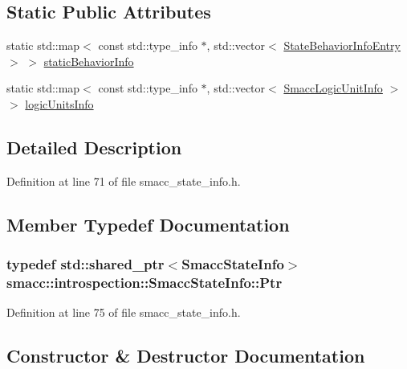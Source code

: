\subsection*{Static Public Attributes}
\begin{DoxyCompactItemize}
\item 
static std\+::map$<$ const std\+::type\+\_\+info $\ast$, std\+::vector$<$ \hyperlink{structsmacc_1_1introspection_1_1StateBehaviorInfoEntry}{State\+Behavior\+Info\+Entry} $>$ $>$ \hyperlink{classsmacc_1_1introspection_1_1SmaccStateInfo_a2cc62c6c9dec1a4f5294f8430efb71f2}{static\+Behavior\+Info}
\item 
static std\+::map$<$ const std\+::type\+\_\+info $\ast$, std\+::vector$<$ \hyperlink{structsmacc_1_1introspection_1_1SmaccLogicUnitInfo}{Smacc\+Logic\+Unit\+Info} $>$ $>$ \hyperlink{classsmacc_1_1introspection_1_1SmaccStateInfo_a7a22f3c1ea22042a19f897db4ecfeb67}{logic\+Units\+Info}
\end{DoxyCompactItemize}


\subsection{Detailed Description}


Definition at line 71 of file smacc\+\_\+state\+\_\+info.\+h.



\subsection{Member Typedef Documentation}
\subsubsection[{\texorpdfstring{Ptr}{Ptr}}]{\setlength{\rightskip}{0pt plus 5cm}typedef std\+::shared\+\_\+ptr$<${\bf Smacc\+State\+Info}$>$ {\bf smacc\+::introspection\+::\+Smacc\+State\+Info\+::\+Ptr}}\hypertarget{classsmacc_1_1introspection_1_1SmaccStateInfo_a374ef2022bca958ab14469931fc4dcc1}{}\label{classsmacc_1_1introspection_1_1SmaccStateInfo_a374ef2022bca958ab14469931fc4dcc1}


Definition at line 75 of file smacc\+\_\+state\+\_\+info.\+h.



\subsection{Constructor \& Destructor Documentation}
